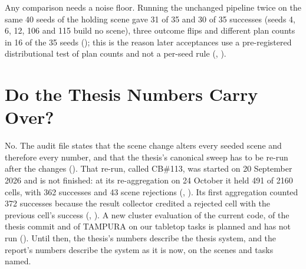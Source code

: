 Any comparison needs a noise floor. Running the unchanged pipeline twice on the
same 40 seeds of the holding scene gave 31 of 35 and 30 of 35 successes (seeds 4, 6,
12, 106 and 115 build no scene), three outcome flips and different plan counts in 16
of the 35 seeds ();
this is the reason later acceptances use a pre-registered distributional test of
plan counts and not a per-seed rule (, ).

\section{Do the Thesis Numbers Carry Over?}
\label{sec:numbers-carry}

No. The audit file states that the scene change alters every seeded scene and
therefore every number, and that the thesis's canonical sweep has to be re-run
after the changes (). That re-run, called CB\#113, was started on
20 September 2026 and is not finished: at its re-aggregation on 24 October it
held 491 of 2160 cells, with 362 successes and 43 scene rejections (,
). Its first aggregation counted 372 successes because the result
collector credited a rejected cell with the previous cell's success
(, ). A new cluster evaluation of the current code, of the thesis
commit and of TAMPURA on our tabletop tasks is planned and has not run
(). Until then, the thesis's numbers describe the thesis system, and the
report's numbers describe the system as it is now, on the scenes and tasks named.
